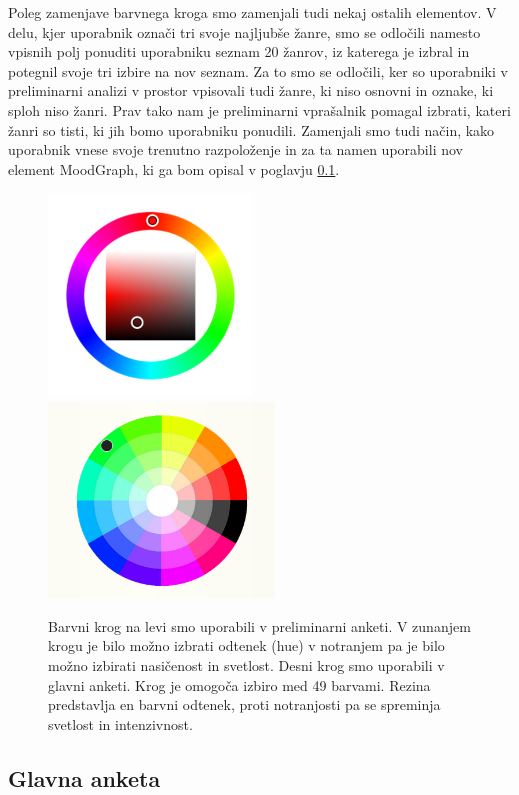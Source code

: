 \documentclass[a4paper, 12pt]{book}
\begin{document}
{Poleg zamenjave barvnega kroga smo zamenjali tudi nekaj ostalih elementov. V delu, kjer uporabnik označi tri svoje najljubše žanre, smo se odločili namesto vpisnih polj ponuditi uporabniku seznam 20 žanrov, iz katerega je izbral in potegnil svoje tri izbire na nov seznam.  Za to smo se odločili, ker so uporabniki v preliminarni analizi v prostor vpisovali tudi žanre, ki niso osnovni in oznake, ki sploh niso žanri. Prav tako nam je preliminarni vprašalnik pomagal izbrati, kateri žanri so tisti, ki jih bomo uporabniku ponudili. Zamenjali smo tudi način, kako uporabnik vnese svoje trenutno razpoloženje in za ta namen uporabili nov element MoodGraph, ki ga bom opisal v poglavju \ref{glavnaanketa}. 

\begin{figure}[ht]
\centering
\includegraphics[width=54mm]{colorwheelold.png}
\includegraphics[width=60mm]{colorwheel.png}

\caption{Barvni krog na levi smo uporabili v preliminarni anketi. V zunanjem krogu je bilo možno izbrati odtenek (hue) v notranjem pa je bilo možno izbirati nasičenost in svetlost. Desni krog smo uporabili v glavni anketi. Krog je omogoča izbiro med 49 barvami. Rezina predstavlja en barvni odtenek, proti notranjosti pa se spreminja svetlost in intenzivnost. }
\label{colorwheels}
\end{figure}

\subsection{Glavna anketa}
\label{glavnaanketa}

}
\end{document}
